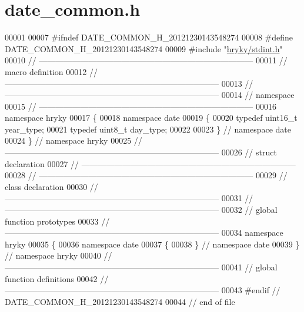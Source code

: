 \hypertarget{date__common_8h_source}{\section{date\-\_\-common.\-h}
}

\begin{DoxyCode}
00001 
00007 \textcolor{preprocessor}{#ifndef DATE\_COMMON\_H\_20121230143548274}
00008 \textcolor{preprocessor}{}\textcolor{preprocessor}{#define DATE\_COMMON\_H\_20121230143548274}
00009 \textcolor{preprocessor}{}\textcolor{preprocessor}{#include "\hyperlink{stdint_8h}{hryky/stdint.h}"}
00010 \textcolor{comment}{//
      ------------------------------------------------------------------------------}
00011 \textcolor{comment}{// macro definition}
00012 \textcolor{comment}{//
      ------------------------------------------------------------------------------}
00013 \textcolor{comment}{//
      ------------------------------------------------------------------------------}
00014 \textcolor{comment}{// namespace}
00015 \textcolor{comment}{//
      ------------------------------------------------------------------------------}
00016 \textcolor{keyword}{namespace }hryky
00017 \{
00018 \textcolor{keyword}{namespace }date
00019 \{
00020     \textcolor{keyword}{typedef} uint16\_t year\_type;
00021     \textcolor{keyword}{typedef} uint8\_t day\_type;
00022     
00023 \} \textcolor{comment}{// namespace date}
00024 \} \textcolor{comment}{// namespace hryky}
00025 \textcolor{comment}{//
      ------------------------------------------------------------------------------}
00026 \textcolor{comment}{// struct declaration}
00027 \textcolor{comment}{//
      ------------------------------------------------------------------------------}
00028 \textcolor{comment}{//
      ------------------------------------------------------------------------------}
00029 \textcolor{comment}{// class declaration}
00030 \textcolor{comment}{//
      ------------------------------------------------------------------------------}
00031 \textcolor{comment}{//
      ------------------------------------------------------------------------------}
00032 \textcolor{comment}{// global function prototypes}
00033 \textcolor{comment}{//
      ------------------------------------------------------------------------------}
00034 \textcolor{keyword}{namespace }hryky
00035 \{
00036 \textcolor{keyword}{namespace }date
00037 \{
00038 \} \textcolor{comment}{// namespace date}
00039 \} \textcolor{comment}{// namespace hryky}
00040 \textcolor{comment}{//
      ------------------------------------------------------------------------------}
00041 \textcolor{comment}{// global function definitions}
00042 \textcolor{comment}{//
      ------------------------------------------------------------------------------}
00043 \textcolor{preprocessor}{#endif // DATE\_COMMON\_H\_20121230143548274}
00044 \textcolor{preprocessor}{}\textcolor{comment}{// end of file}
\end{DoxyCode}
